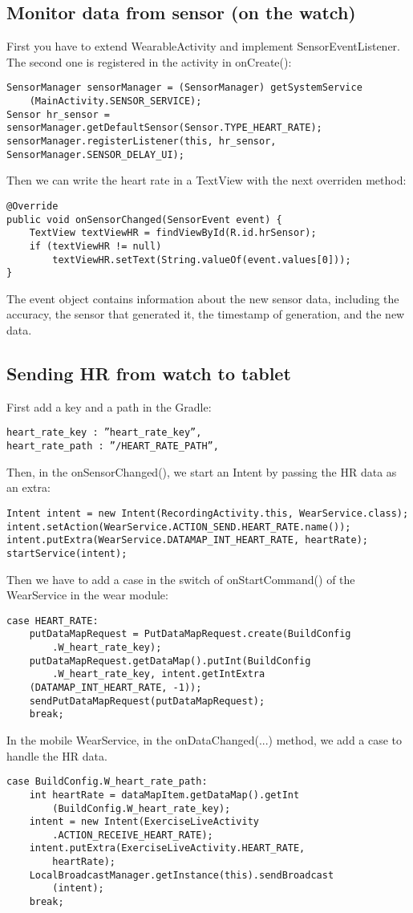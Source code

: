 \documentclass[11pt]{article}
\begin{document}
\subsection{Monitor data from sensor (on the watch)}
First you have to extend WearableActivity and implement SensorEventListener. The second one is registered in the activity in onCreate():
\begin{lstlisting}
SensorManager sensorManager = (SensorManager) getSystemService
    (MainActivity.SENSOR_SERVICE);
Sensor hr_sensor = sensorManager.getDefaultSensor(Sensor.TYPE_HEART_RATE);
sensorManager.registerListener(this, hr_sensor, SensorManager.SENSOR_DELAY_UI);
\end{lstlisting}
Then we can write the heart rate in a TextView with the next overriden method:
\begin{lstlisting}
@Override
public void onSensorChanged(SensorEvent event) {
    TextView textViewHR = findViewById(R.id.hrSensor);
    if (textViewHR != null)
        textViewHR.setText(String.valueOf(event.values[0]));
}
\end{lstlisting}
The event object contains information about the new sensor data, including the accuracy, the sensor that generated it, the timestamp of generation, and the new data.

\subsection{Sending HR from watch to tablet}
First add a key and a path in the Gradle:
\begin{lstlisting}
heart_rate_key : ”heart_rate_key”,
heart_rate_path : ”/HEART_RATE_PATH”,
\end{lstlisting}
Then, in the onSensorChanged(), we start an Intent by passing the HR data as an extra:
\begin{lstlisting}
Intent intent = new Intent(RecordingActivity.this, WearService.class);
intent.setAction(WearService.ACTION_SEND.HEART_RATE.name());
intent.putExtra(WearService.DATAMAP_INT_HEART_RATE, heartRate);
startService(intent);
\end{lstlisting}
Then we have to add a case in the switch of onStartCommand() of the WearService in the wear module:
\begin{lstlisting}
case HEART_RATE:
    putDataMapRequest = PutDataMapRequest.create(BuildConfig
        .W_heart_rate_key);
    putDataMapRequest.getDataMap().putInt(BuildConfig
        .W_heart_rate_key, intent.getIntExtra
    (DATAMAP_INT_HEART_RATE, -1));
    sendPutDataMapRequest(putDataMapRequest);
    break;
\end{lstlisting}
In the mobile WearService, in the onDataChanged(...) method, we add a case to handle the HR data.
\begin{lstlisting}
case BuildConfig.W_heart_rate_path:
    int heartRate = dataMapItem.getDataMap().getInt
        (BuildConfig.W_heart_rate_key);
    intent = new Intent(ExerciseLiveActivity
        .ACTION_RECEIVE_HEART_RATE);
    intent.putExtra(ExerciseLiveActivity.HEART_RATE,
        heartRate);
    LocalBroadcastManager.getInstance(this).sendBroadcast
        (intent);
    break;
\end{lstlisting}
\end{document}
